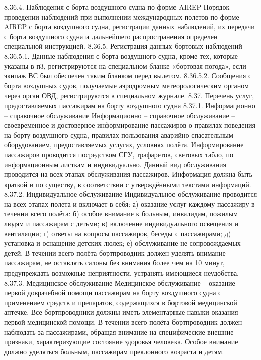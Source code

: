 8.36.4.	Наблюдения с борта воздушного судна по форме AIREP
Порядок проведении наблюдений при выполнении международных полетов по форме AIREP с борта воздушного судна, регистрации данных наблюдений, их передачи с борта воздушного судна и дальнейшего распространения определен специальной инструкцией.
8.36.5.	Регистрация данных бортовых наблюдений
8.36.5.1. Данные наблюдения с борта воздушного судна, кроме тех, которые указаны в п3, регистрируются на специальном бланке «бортовая погода», если экипаж ВС был обеспечен таким бланком перед вылетом.
8.36.5.2. Сообщения с борта воздушных судов, получаемые аэродромным метеорологическим органом через орган ОВД, регистрируются в специальном журнале. 
8.37.	Перечень услуг, предоставляемых пассажирам на борту воздушного судна
8.37.1.	Информационно – справочное обслуживание
Информационно – справочное обслуживание – своевременное и достоверное информирование пассажиров о правилах поведения на борту воздушного судна, правилах пользования аварийно-спасательным оборудованием, предоставляемых услугах, условиях полёта. Информирование пассажиров проводится посредством СГУ, трафаретов, световых табло, по информационным листкам и индивидуально. Данный вид обслуживания проводится на всех этапах обслуживания пассажиров. Информация должна быть краткой и по существу, в соответствии с утверждёнными текстами информаций.
8.37.2.	Индивидуальное обслуживание
Индивидуальное обслуживание проводится на всех этапах полета и включает в себя:
а)	оказание услуг каждому пассажиру в течении всего полёта:
б)	особое внимание к больным, инвалидам, пожилым людям и пассажирам с детьми;
в)	включение индивидуального освещения и вентиляции;
г)	ответы на вопросы пассажиров, беседы с пассажирами;
д)	установка и оснащение детских люлек;
е)	обслуживание не сопровождаемых детей.
В течении всего полёта бортпроводник должен уделять внимание пассажирам, не оставлять салоны без внимания более чем на 10 минут, предупреждать возможные неприятности, устранять имеющиеся неудобства.
8.37.3.	Медицинское обслуживание
Медицинское обслуживание – оказание первой доврачебной помощи пассажирам на борту воздушного судна с применением средств и препаратов, содержащихся в бортовой медицинской аптечке. Все бортпроводники должны иметь элементарные навыки оказания первой медицинской помощи. В течении всего полёта бортпроводник должен наблюдать за пассажирами, обращая внимание на специфические внешние признаки, характеризующие состояние здоровья человека. Особое внимание должно уделяться больным, пассажирам преклонного возраста и детям.
